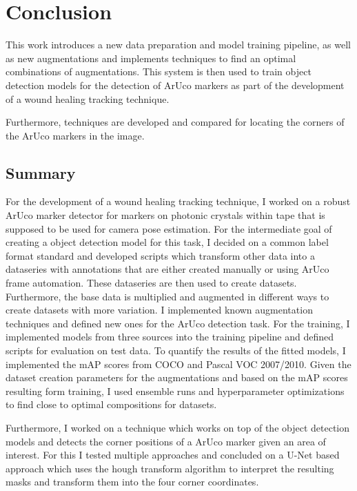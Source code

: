 \documentclass[10pt]{book}
\begin{document}

\chapter{Conclusion}
\label{chap:conclusion}

This work introduces a new data preparation and model training pipeline, as well as new augmentations and implements techniques to find an optimal combinations of augmentations. This system is then used to train object detection models for the detection of \ac{ArUco} markers as part of the development of a wound healing tracking technique. 

Furthermore, techniques are developed and compared for locating the corners of the \ac{ArUco} markers in the image.

\section{Summary}

For the development of a wound healing tracking technique, I worked on a robust \ac{ArUco} marker detector for markers on photonic crystals within tape that is supposed to be used for camera pose estimation. For the intermediate goal of creating a object detection model for this task, I decided on a common label format standard and developed scripts which transform other data into a dataseries with annotations that are either created manually or using \ac{ArUco} frame automation. These dataseries are then used to create datasets. Furthermore, the base data is multiplied and augmented in different ways to create datasets with more variation. I implemented known augmentation techniques and defined new ones for the \ac{ArUco} detection task. For the training, I implemented models from three sources into the training pipeline and defined scripts for evaluation on test data. To quantify the results of the fitted models, I implemented the \ac{mAP} scores from \ac{COCO} and Pascal VOC 2007/2010. Given the dataset creation parameters for the augmentations and based on the \ac{mAP} scores resulting form training, I used ensemble runs and hyperparameter optimizations to find close to optimal compositions for datasets. 

Furthermore, I worked on a technique which works on top of the object detection models and detects the corner positions of a \ac{ArUco} marker given an area of interest. For this I tested multiple approaches and concluded on a U-Net based approach which uses the hough transform algorithm to interpret the resulting masks and transform them into the four corner coordinates.
\end{document}
